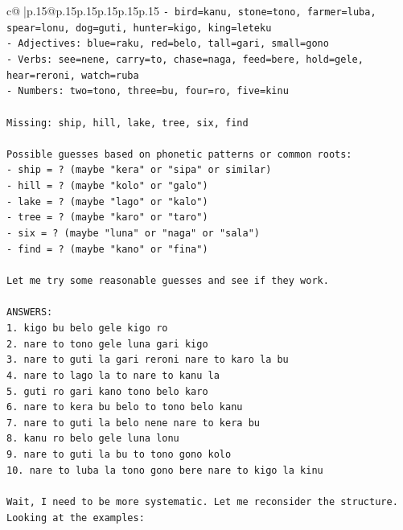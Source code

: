 \documentclass{article}
\begin{document}
{\begin{supertabular}{c@{$\;$}|p{.15\linewidth}@{}p{.15\linewidth}p{.15\linewidth}p{.15\linewidth}p{.15\linewidth}p{.15\linewidth}}
{{{\texttt{{-} bird=kanu, stone=tono, farmer=luba, spear=lonu, dog=guti, hunter=kigo, king=leteku} \\
\texttt{{-} Adjectives: blue=raku, red=belo, tall=gari, small=gono} \\
\texttt{{-} Verbs: see=nene, carry=to, chase=naga, feed=bere, hold=gele, hear=reroni, watch=ruba} \\
\texttt{{-} Numbers: two=tono, three=bu, four=ro, five=kinu} \\
\\ 
\texttt{Missing: ship, hill, lake, tree, six, find} \\
\\ 
\texttt{Possible guesses based on phonetic patterns or common roots:} \\
\texttt{{-} ship = ? (maybe "kera" or "sipa" or similar)} \\
\texttt{{-} hill = ? (maybe "kolo" or "galo")} \\
\texttt{{-} lake = ? (maybe "lago" or "kalo")} \\
\texttt{{-} tree = ? (maybe "karo" or "taro")} \\
\texttt{{-} six = ? (maybe "luna" or "naga" or "sala")} \\
\texttt{{-} find = ? (maybe "kano" or "fina")} \\
\\ 
\texttt{Let me try some reasonable guesses and see if they work.} \\
\\ 
\texttt{ANSWERS:} \\
\texttt{1. kigo bu belo gele kigo ro} \\
\texttt{2. nare to tono gele luna gari kigo} \\
\texttt{3. nare to guti la gari reroni nare to karo la bu} \\
\texttt{4. nare to lago la to nare to kanu la} \\
\texttt{5. guti ro gari kano tono belo karo} \\
\texttt{6. nare to kera bu belo to tono belo kanu} \\
\texttt{7. nare to guti la belo nene nare to kera bu} \\
\texttt{8. kanu ro belo gele luna lonu} \\
\texttt{9. nare to guti la bu to tono gono kolo} \\
\texttt{10. nare to luba la tono gono bere nare to kigo la kinu} \\
\\ 
\texttt{Wait, I need to be more systematic. Let me reconsider the structure. Looking at the examples:} \\
}}}
\end{supertabular}}
\end{document}
